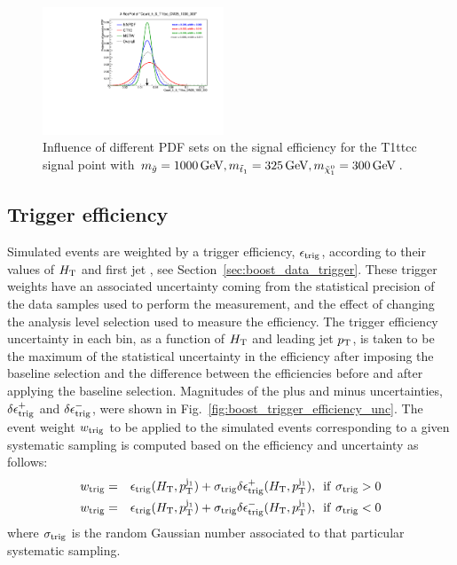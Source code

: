 \begin{figure}[htpb]
\centering
\includegraphics[width=0.48\textwidth,clip=true,trim=0 0.2cm 0 1.2cm]
{figures/razor_systematics/h_S_T1ttcc_DM25_1000_300}
\caption{Influence of different PDF sets on the signal efficiency for the T1ttcc signal point with
$m_{\tilde{g}}=1000\,\text{Ge\hspace{-.08em}V}, m_{\tilde{t}_1}=325\,\text{Ge\hspace{-.08em}V}, m_{\tilde{\chi}_1^0}=300\,\text{Ge\hspace{-.08em}V}$. 
\label{fig:PDF_effect_on_sig}}
\end{figure}

\subsection{Trigger efficiency}  

Simulated events are weighted by a trigger efficiency, $\epsilon_{\rm trig}$, according to their
values of $H_{\mathrm{T}}$ and first jet \pt, see Section~\ref{sec:boost_data_trigger}. These trigger weights
have an associated uncertainty coming from the statistical precision of the data samples used to
perform the measurement, and the effect of changing the analysis level selection used to measure the
efficiency. The trigger efficiency uncertainty in each bin, as a function of $H_{\mathrm{T}}$
and leading jet $p_{\mathrm{T}}$, is taken to be the maximum of the statistical uncertainty in the efficiency
after imposing the baseline selection and the difference between the efficiencies before and after
applying the baseline selection. 
Magnitudes of the plus and minus uncertainties, $\delta\epsilon^+_{\rm trig}$ and
$\delta\epsilon^-_{\rm trig}$, were shown in Fig.~\ref{fig:boost_trigger_efficiency_unc}.
The event weight $w_{\rm trig}$ to be applied to the simulated events corresponding to a given
systematic sampling is computed based on the efficiency and uncertainty as follows:
\begin{eqnarray}
w_{\rm trig} & = & \epsilon_{\rm trig}(H_{\mathrm{T}}, p_{\mathrm{T}}^{{\rm j}_1}) + \sigma_{\rm trig}
\delta\epsilon^+_{\rm trig}(H_{\mathrm{T}}, p_{\mathrm{T}}^{{\rm j}_1}), \,\,\, {\rm if} \,\, \sigma_{\rm trig} > 0 \\ 
w_{\rm trig} & = & \epsilon_{\rm trig}(H_{\mathrm{T}}, p_{\mathrm{T}}^{{\rm j}_1}) + \sigma_{\rm trig}
\delta\epsilon^-_{\rm trig}(H_{\mathrm{T}}, p_{\mathrm{T}}^{{\rm j}_1}), \,\,\, {\rm if} \,\, \sigma_{\rm trig} < 0 
\end{eqnarray}
where $\sigma_{\rm trig}$ is the random Gaussian number associated to that particular
systematic sampling.	


